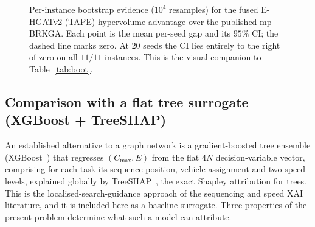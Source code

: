 \documentclass[11pt]{article}
\newcommand{\Cmax}{C_{\max}}
\begin{document}
\begin{figure}[t]
\centering
{}
\caption{Per-instance bootstrap evidence ($10^4$ resamples) for the fused E-HGATv2 (TAPE)
hypervolume advantage over the published mp-BRKGA. Each point is the mean per-seed gap and
its $95\%$ CI; the dashed line marks zero. At $20$ seeds the CI lies entirely to the right of
zero on all $11/11$ instances. This is the visual companion to Table~\ref{tab:boot}.}
\label{fig:forest}
\end{figure}

\subsection{Comparison with a flat tree surrogate (XGBoost + TreeSHAP)}
\label{sec:xgb}
An established alternative to a graph network is a gradient-boosted tree ensemble
(XGBoost~\cite{chen2016xgboost}) that regresses $(\Cmax,E)$ from the flat $4N$
decision-variable vector, comprising for each task its sequence position, vehicle
assignment and two speed levels, explained globally by
TreeSHAP~\cite{lundberg2020treeshap}, the exact Shapley attribution for trees. This is
the localised-search-guidance approach of the sequencing and speed XAI literature, and it
is included here as a baseline surrogate. Three properties of the present problem
determine what such a model can attribute.
\end{document}
